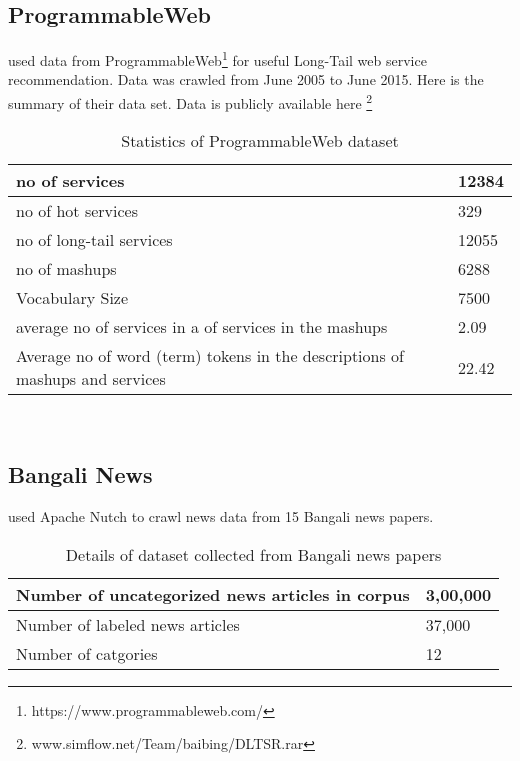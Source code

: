 \subsection{ProgrammableWeb}
\cite{N59}used data from ProgrammableWeb\footnote{https://www.programmableweb.com/} for useful Long-Tail web service recommendation. Data was crawled from June 2005 to June 2015. Here is the summary of their data set. Data is publicly available here \footnote{www.simflow.net/Team/baibing/DLTSR.rar}
\\
\begin{table}[!htbp] 
\centering
\footnotesize
\def\arraystretch{1.4}%
\centering
\begin{tabular}{|p{8.1cm}|p{2.6cm}|}
\hline
no of services & 12384
\\
\hline 
no of hot services & 329
\\
\hline 
no of long-tail services & 12055
\\
\hline 
no of mashups & 6288
\\
\hline
Vocabulary Size & 7500
\\
\hline 
average no of services in a of services in the mashups & 2.09
\\
\hline
Average no of word (term) tokens in the descriptions of mashups and services & 22.42
\\
\hline
\end{tabular}
\caption{Statistics of ProgrammableWeb dataset}
\label{table:23}

\end{table}
\\
\subsection{Bangali News}
\cite{N12} used Apache Nutch to crawl news data from 15 Bangali news papers. 
\\
\begin{table}[!htbp] 
\centering
\footnotesize
\def\arraystretch{1.4}%
\centering
\begin{tabular}{|p{8cm}|p{2cm}|}
\hline
Number of uncategorized news articles in corpus & 3,00,000
\\
\hline
Number of labeled news articles & 37,000
\\
\hline 
Number of catgories & 12
\\
\hline
\end{tabular}

\caption{Details of dataset collected from Bangali news papers}
\label{table:19}
\end{table}
